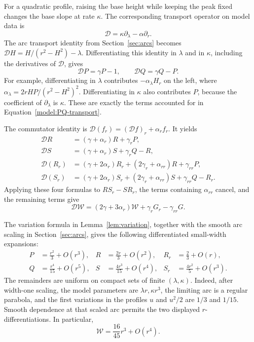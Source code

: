 For a quadratic profile, raising the base height while keeping the peak
fixed changes the base slope at rate \(\kappa\).  The corresponding
transport operator on model data is
\begin{equation}
 \mathcal D=\kappa\partial_\lambda-\alpha\partial_r.
 \label{model:transport-operator}
\end{equation}
The arc transport identity from Section~\ref{sec:arcs} becomes
\(\mathcal DH=H/(r^2-H^2)-\lambda\).
Differentiating this identity in \(\lambda\) and in \(\kappa\), including
the derivatives of \(\mathcal D\), gives
\begin{equation}
 \mathcal DP=\gamma P-1,\qquad
 \mathcal DQ=\gamma Q-P.
 \label{model:PQ-transport}
\end{equation}
For example, differentiating in \(\lambda\) contributes
\(-\alpha_\lambda H_r\) on the left, where
\(\alpha_\lambda=2rHP/(r^2-H^2)^2\).  Differentiating in \(\kappa\)
also contributes \(P\), because the coefficient of
\(\partial_\lambda\) is \(\kappa\).  These are exactly the terms
accounted for in Equation~\eqref{model:PQ-transport}.

The commutator identity is
\(\mathcal D(f_r)=(\mathcal Df)_r+\alpha_r f_r\).
It yields
\begin{align}
 \mathcal DR&=(\gamma+\alpha_r)R+\gamma_rP,\nonumber\\
 \mathcal DS&=(\gamma+\alpha_r)S+\gamma_rQ-R,
 \label{model:RS-transport}\\
 \mathcal D(R_r)&=(\gamma+2\alpha_r)R_r
                  +(2\gamma_r+\alpha_{rr})R+\gamma_{rr}P,\nonumber\\
 \mathcal D(S_r)&=(\gamma+2\alpha_r)S_r
                  +(2\gamma_r+\alpha_{rr})S+\gamma_{rr}Q-R_r.
 \label{model:RSr-transport}
\end{align}
Applying these four formulas to \(RS_r-SR_r\), the terms containing
\(\alpha_{rr}\) cancel, and the remaining terms give
\begin{equation}
 \mathcal D\mathcal W
 =(2\gamma+3\alpha_r)\mathcal W
   +\gamma_rG_r-\gamma_{rr}G.
 \label{model:W-transport}
\end{equation}

The variation formula in Lemma~\ref{lem:variation}, together with the
smooth arc scaling in Section~\ref{sec:arcs}, gives the following
differentiated small-width expansions:
\begin{align}
 P&=\frac{r^2}{3}+O(r^3),&
 R&=\frac{2r}{3}+O(r^2),&
 R_r&=\frac23+O(r),\nonumber\\
 Q&=\frac{r^4}{15}+O(r^5),&
 S&=\frac{4r^3}{15}+O(r^4),&
 S_r&=\frac{4r^2}{5}+O(r^3).
 \label{model:small-width}
\end{align}
The remainders are uniform on compact sets of finite
\((\lambda,\kappa)\).  Indeed, after width-one scaling, the model
parameters are \(\lambda r,\kappa r^3\), the limiting arc is a regular
parabola, and the first variations in the profiles \(u\) and \(u^2/2\)
are \(1/3\) and \(1/15\).  Smooth dependence at that scaled arc permits
the two displayed \(r\)-differentiations.  In particular,
\begin{equation}
 \mathcal W=\frac{16}{45}r^3+O(r^4).
 \label{model:W-small-width}
\end{equation}

